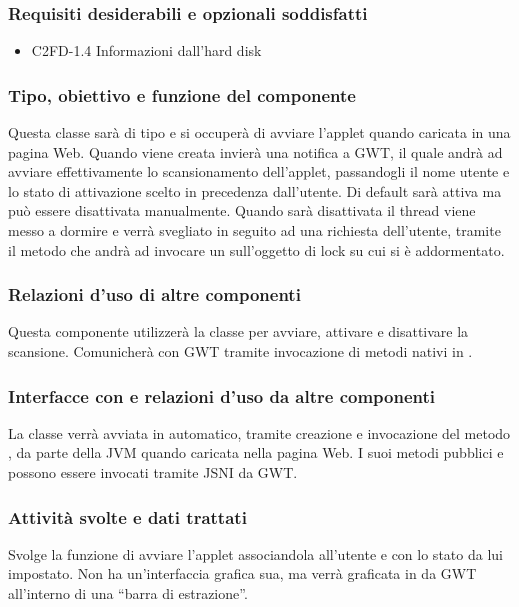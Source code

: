 \subsubsection*{Requisiti desiderabili e opzionali soddisfatti}
\begin{itemize}
   \item C2FD-1.4 Informazioni dall'hard disk
\end{itemize}
\subsubsection*{Tipo, obiettivo e funzione del componente}
Questa classe sar\`a di tipo  e si occuper\`a di avviare l'applet
quando caricata in una pagina Web. Quando viene creata invier\`a una notifica a
GWT, il quale andr\`a ad avviare effettivamente lo scansionamento dell'applet,
passandogli il nome utente e lo stato di attivazione scelto in precedenza
dall'utente. Di default sar\`a attiva ma pu\`o essere disattivata manualmente.
Quando sar\`a disattivata il thread  viene messo a dormire e verr\`a
svegliato in seguito ad una richiesta dell'utente, tramite il metodo
 che andr\`a ad invocare un  sull'oggetto di lock su
cui  si \`e addormentato.

\subsubsection*{Relazioni d'uso di altre componenti}
Questa componente utilizzer\`a la classe  per
avviare, attivare e disattivare la scansione. Comunicher\`a con GWT tramite
invocazione di metodi nativi in .

\subsubsection*{Interfacce con e relazioni d'uso da altre componenti}
La classe verr\`a avviata in automatico, tramite creazione e invocazione del
metodo , da parte della JVM quando caricata nella pagina Web.
I suoi metodi pubblici  e  possono essere invocati
tramite JSNI da GWT.

\subsubsection*{Attivit\`a svolte e dati trattati}
Svolge la funzione di avviare l'applet associandola all'utente e con lo
stato da lui impostato. Non ha un'interfaccia grafica sua, ma verr\`a graficata
in  da GWT all'interno di una ``barra di estrazione''.\\
\\

